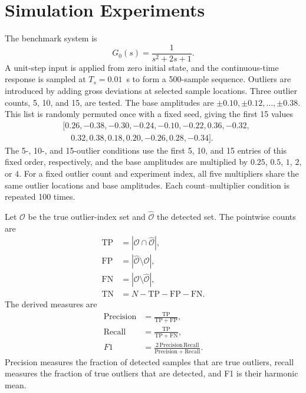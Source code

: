 \documentclass[journal]{IEEEtran}
\newcommand{\Oh}{\widehat{\mathcal O}}
\begin{document}
\section{Simulation Experiments}
The benchmark system is
\begin{equation}
G_0(s)=\frac{1}{s^2+2s+1}.
\end{equation}
A unit-step input is applied from zero initial state, and the continuous-time response is sampled at $T_s=0.01$~s to form a 500-sample sequence. Outliers are introduced by adding gross deviations at selected sample locations. Three outlier counts, 5, 10, and 15, are tested. The base amplitudes are $\pm0.10,\pm0.12,\ldots,\pm0.38$. This list is randomly permuted once with a fixed seed, giving the first 15 values
\begin{equation}
\begin{aligned}
&[0.26,-0.38,-0.30,-0.24,-0.10,-0.22,0.36,-0.32,\\
&\quad 0.32,0.38,0.18,0.20,-0.26,0.28,-0.34].
\end{aligned}
\end{equation}
The 5-, 10-, and 15-outlier conditions use the first 5, 10, and 15 entries of this fixed order, respectively, and the base amplitudes are multiplied by $0.25$, $0.5$, $1$, $2$, or $4$. For a fixed outlier count and experiment index, all five multipliers share the same outlier locations and base amplitudes. Each count--multiplier condition is repeated 100 times.

Let $\mathcal O$ be the true outlier-index set and $\Oh$ the detected set. The pointwise counts are
\begin{align}
\mathrm{TP}&=|\mathcal O\cap\Oh|,\\
\mathrm{FP}&=|\Oh\setminus\mathcal O|,\\
\mathrm{FN}&=|\mathcal O\setminus\Oh|,\\
\mathrm{TN}&=N-\mathrm{TP}-\mathrm{FP}-\mathrm{FN}.
\end{align}
The derived measures are
\begin{align}
\mathrm{Precision}&=\frac{\mathrm{TP}}{\mathrm{TP}+\mathrm{FP}},\\
\mathrm{Recall}&=\frac{\mathrm{TP}}{\mathrm{TP}+\mathrm{FN}},\\
F1&=\frac{2\,\mathrm{Precision}\,\mathrm{Recall}}{\mathrm{Precision}+\mathrm{Recall}}.
\end{align}
Precision measures the fraction of detected samples that are true outliers, recall measures the fraction of true outliers that are detected, and F1 is their harmonic mean.
\end{document}
